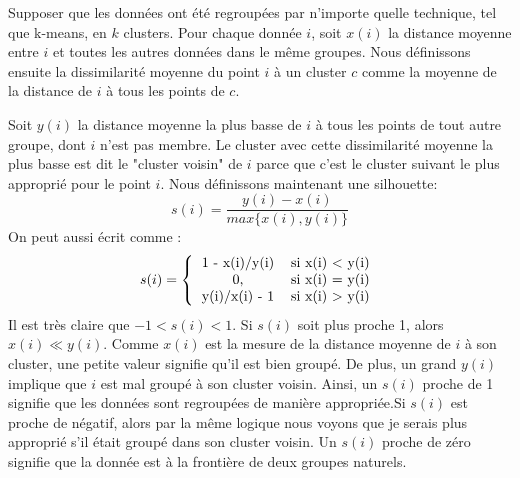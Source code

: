 Supposer que les données ont été regroupées par n'importe quelle technique, tel que k-means, en $k$ clusters. Pour chaque donnée $i$, soit $x(i)$ la distance moyenne entre $i$ et toutes les autres données dans le même groupes. Nous définissons ensuite la dissimilarité moyenne du point $i$ à un cluster $c$ comme la moyenne de la distance de $i$ à tous les points de $c$.

Soit $y(i)$ la distance moyenne la plus basse de $i$ à tous les points de tout autre groupe, dont $i$ n'est pas membre. Le cluster avec cette dissimilarité moyenne la plus basse est dit le "cluster voisin" de $i$ parce que c'est le cluster suivant le plus approprié pour le point $i$. Nous définissons maintenant une silhouette: 
$$s(i) = \frac{y(i) - x(i)}{max\{ x(i), y(i)\}}$$
On peut aussi écrit comme : 
$$s(i) = \left\{ 
\begin {tabular}{c c}
1 - x(i)/y(i) & si x(i) < y(i) \\
0, & si x(i) = y(i)\\
y(i)/x(i) - 1 & si x(i) > y(i)
\end{tabular}
\right.$$
Il est très claire que $-1 < s(i) < 1$. Si $s(i)$ soit plus proche 1, alors $x(i)\ll y(i)$. Comme $x(i)$ est la mesure de la distance moyenne de $i$  à son cluster, une petite valeur signifie qu'il est bien groupé. De plus, un grand $y(i)$ implique que $i$ est mal groupé à son cluster voisin. Ainsi, un $s(i)$ proche de 1 signifie que les données sont regroupées de manière appropriée.Si $s(i)$ est proche de négatif, alors par la même logique nous voyons que je serais plus approprié s'il était groupé dans son cluster voisin. Un $s(i)$ proche de zéro signifie que la donnée est à la frontière de deux groupes naturels. 
